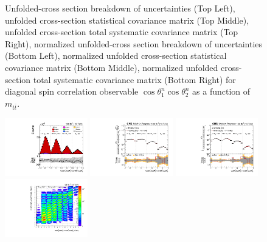 \begin{figure}[htb]
\begin{center}
\caption{Unfolded-cross section breakdown of uncertainties (Top Left), unfolded cross-section statistical covariance matrix (Top Middle), unfolded cross-section total systematic covariance matrix (Top Right), normalized unfolded-cross section breakdown of uncertainties (Bottom Left), normalized unfolded cross-section statistical covariance matrix (Bottom Middle), normalized unfolded cross-section total systematic covariance matrix (Bottom Right) for diagonal spin correlation observable $\cos\theta_{1}^{n}\cos\theta_{2}^{n}$ as a function of $m_{t\bar{t}}$.}
\label{fig:c_nn_mttbar_uncertainties}
\end{center}
\end{figure}
\clearpage
\begin{figure}[htb]
\begin{center}
 \includegraphics[width=0.32\textwidth]{fig_fullRun2UL/controlplots/combined/Hyp_LLBarCPrk_vs_TTBarMass.pdf}
 \includegraphics[width=0.32\textwidth]{fig_fullRun2UL/unfolding/combined/UnfoldedResults_c_Prk_mttbar.pdf}
 \includegraphics[width=0.32\textwidth]{fig_fullRun2UL/unfolding/combined/UnfoldedResultsNorm_c_Prk_mttbar.pdf} \\
 \includegraphics[width=0.32\textwidth]{fig_fullRun2UL/unfolding/combined/ResponseMatrix_c_Prk_mttbar.pdf}

\end{center}
\end{figure}
